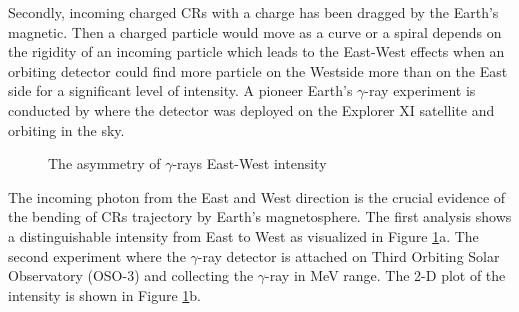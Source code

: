 Secondly, incoming charged CRs with a charge has been dragged 
by the Earth's magnetic. Then a charged particle would move as 
a curve or a spiral depends on the rigidity of an incoming particle
which leads to the East-West effects when an orbiting detector could 
find more particle on the Westside more than on the East side for 
a significant level of intensity. A pioneer Earth's $\gamma$-ray 
experiment is conducted by \cite{kraushaar1965explorer} where the 
detector was deployed on the Explorer XI satellite and orbiting in the sky.


\begin{figure}[h!]
    \centering
        \hfill
        \caption{
            The asymmetry of $\gamma$-rays East-West intensity 
        }
       \label{fig:gamma_ew}
\end{figure}
The incoming photon from the East and West direction is the crucial evidence 
of the bending of CRs trajectory by Earth's magnetosphere. The first 
analysis shows a distinguishable intensity from East to West as visualized 
in Figure \ref{fig:gamma_ew}a. The second experiment where
the $\gamma$-ray detector is attached on Third Orbiting Solar
Observatory (OSO-3) and collecting the $\gamma$-ray in MeV range.
The 2-D plot of the intensity is shown in Figure \ref{fig:gamma_ew}b.

